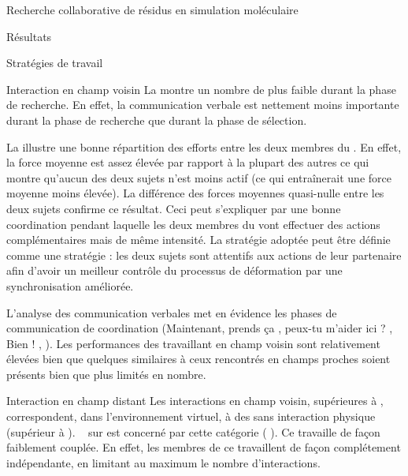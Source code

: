 \documentclass[myfrancais]{mythesis}
\begin{document}
\begin{mychapter}{Recherche collaborative de résidus en simulation moléculaire}
\begin{mysection}{Résultats}
\begin{mysubsection}{Stratégies de travail}
\begin{mysubsubsection}{Interaction en champ voisin}
					La  montre un nombre de  plus faible durant la phase de recherche.
					En effet, la communication verbale est nettement moins importante durant la phase de recherche que durant la phase de sélection.

					La  illustre une bonne répartition des efforts entre les deux membres du .
					En effet, la force moyenne est assez élevée par rapport à la plupart des autres  ce qui montre qu'aucun des deux sujets n'est moins actif (ce qui entraînerait une force moyenne moins élevée).
					La différence des forces moyennes quasi-nulle entre les deux sujets confirme ce résultat.
					Ceci peut s'expliquer par une bonne coordination pendant laquelle les deux membres du  vont effectuer des actions complémentaires mais de même intensité.
					La stratégie adoptée peut être définie comme une stratégie  : les deux sujets sont attentifs aux actions de leur partenaire afin d'avoir un meilleur contrôle du processus de déformation par une synchronisation améliorée.

					L'analyse des communication verbales met en évidence les phases de communication de coordination (\og Maintenant, prends ça \fg, \og peux-tu m'aider ici ? \fg, \og Bien ! \fg, \myetc).
					Les performances des  travaillant en champ voisin sont relativement élevées bien que quelques  similaires à ceux rencontrés en champs proches soient présents bien que plus limités en nombre.
				\end{mysubsubsection}
				\begin{mysubsubsection}{Interaction en champ distant}
					Les interactions en champ voisin, supérieures à , correspondent, dans l'environnement virtuel, à des  sans interaction physique (supérieur à ).
					~ sur  est concerné par cette catégorie ( ).
					Ce  travaille de façon faiblement couplée.
					En effet, les membres de ce  travaillent de façon complétement indépendante, en limitant au maximum le nombre d'interactions.


\end{mysubsubsection}
\end{mysubsection}
\end{mysection}
\end{mychapter}
\end{document}
